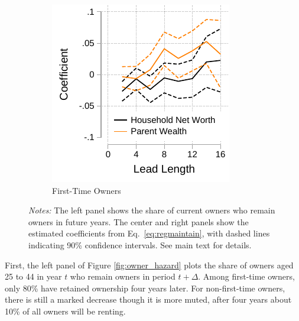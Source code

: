 \documentclass[12pt]{article}
\begin{document}
\begin{figure}[tb]
\begin{subfigure}{0.33\textwidth}
	\end{subfigure}%
	\hfill
	\begin{subfigure}{0.33\textwidth}%
		\caption{First-Time Owners}\label{fig:coef_ftowner}%
		\includegraphics[width=\textwidth]{../tabfig/descr/PSID_coefftowner.pdf}%
	\end{subfigure}%
	
	\caption*{\footnotesize \textit{Notes:} The left panel shows the share of current owners who remain owners in future years. The center and right panels show the estimated coefficients from Eq.~\ref{eq:regmaintain}, with dashed lines indicating 90\% confidence intervals. See main text for details.}
\end{figure}

First, the left panel of Figure \ref{fig:owner_hazard} plots the share of owners aged 25 to 44 in year $t$ who remain owners in period $t+\Delta$. Among first-time owners, only 80\% have retained ownership four years later. For non-first-time owners, there is still a marked decrease though it is more muted, after four years about 10\% of all owners will be renting. 
\end{document}
